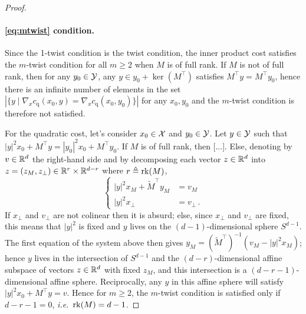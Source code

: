\begin{proof}
\paragraph{\cref{eq:mtwist} condition.} Since the 1-twist condition is the twist condition, the inner product cost satisfies the $m$-twist condition for all $m\geq 2$ when $M$ is of full rank. If $M$ is not of full rank, then for any $y_0\in\mathcal{Y}$, any $y\in y_0+\ker(M^\top)$ satisfies $M^\top y=M^\top y_0$, hence there is an infinite number of elements in the set $|\{y\mid \nabla_x c_{\text{q}}(x_0,y)=\nabla_x c_{\text{q}}(x_0,y_0)\}|$ for any $x_0,y_0$ and the $m$-twist condition is therefore not satisfied.

For the quadratic cost, let's consider $x_0\in\mathcal{X}$ and $y_0\in\mathcal{Y}$. Let $y\in\mathcal{Y}$ such that $|y|^{2}x_{0}+M^\top y=|y_{0}|^{2}x_{0}+M^\top y_{0}$. If $M$ is of full rank, then [...]. Else, denoting by $v\in\mathbb{R}^d$ the right-hand side and by decomposing each vector $z\in\mathbb{R}^d$ into $z=(z_M,z_\perp)\in\mathbb{R}^r\times\mathbb{R}^{d-r}$ where $r \triangleq \operatorname*{rk}(M)$, $$\begin{cases}
|y|^{2}x_{M}+\tilde M^\top y_{M} & =v_{M} \\
|y|^{2}x_{\perp} & =v_{\perp} \,.
\end{cases}$$
If $x_\perp$ and $v_\perp$ are not colinear then it is absurd; else, since $x_{\perp}$ and $v_{\perp}$ are fixed, this means that $|y|^{2}$ is fixed and $y$ lives on the $(d-1)$-dimensional sphere $S^{d-1}$. The first equation of the system above then gives $y_{M}=(\tilde M^\top)^{-1}(v_{M}-|y|^{2}x_{M})$; hence $y$ lives in the intersection of $S^{d-1}$ and the $(d-r)$-dimensional affine subspace of vectors $z\in\mathbb{R}^d$ with fixed $z_M$, and this intersection is a $(d-r-1)$-dimensional affine sphere. Reciprocally, any $y$ in this affine sphere will satisfy $|y|^{2}x_{0}+M^\top y=v$. Hence for $m\geq2$, the $m$-twist condition is satisfied only if $d-r-1=0$, \textit{i.e.}~$\operatorname*{rk}(M)=d-1$.



\end{proof}
